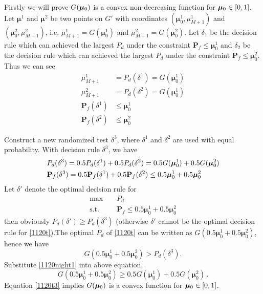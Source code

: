 Firstly we will prove $G(\boldsymbol{\mu}_0)$ is a convex non-decreasing function for $\boldsymbol{\mu}_0 \in [0, 1]$.
 Let $\boldsymbol{\mu}^1$ and  $\boldsymbol{\mu}^2$ be two points on $G'$ with coordinates $(\boldsymbol{\mu}^1_0, \mu_{M+1}^1)$ and $(\boldsymbol{\mu}^2_0, \mu_{M+1}^2)$, i.e. $\mu_{M+1}^1 = G(\boldsymbol{\mu}_0^1)$ and $\mu_{M+1}^2 = G(\boldsymbol{\mu}_0^2)$. Let $\delta_1$ be the decision rule which can achieved the largest $P_d$ under the constraint $\mathbf{P}_f \leq \boldsymbol{\mu}_0^1$ and $\delta_2$ be the decision rule which can achieved the largest $P_d$ under the constraint $\mathbf{P}_{f} \leq \boldsymbol{\mu}_0^2$. Thus we can see 
 \begin{subequations}
\begin{align}
\mu_{M+1}^1 &= P_d(\delta^1) = G(\boldsymbol{\mu}_0^1)\\
\mu_{M+1}^2 &= P_d(\delta^2)=G(\boldsymbol{\mu}_0^1)\\
\mathbf{P}_f(\delta^1) &\leq \boldsymbol{\mu}^1_0\\
\mathbf{P}_f(\delta^2) &\leq \boldsymbol{\mu}^2_0
\end{align}
 \end{subequations}
 
Construct a new randomized test $\delta^3$, where $\delta^1$ and $\delta^2$ are used with equal probability. With decision rule $\delta^3$, we have 
\begin{subequations}
\begin{align}
\label{1120night1}
&P_d(\delta^3) = 0.5P_d(\delta^1)+0.5P_d(\delta^2) = 0.5G(\boldsymbol{\mu}_0^1) + 0.5G(\boldsymbol{\mu}_0^2)\\
&\mathbf{P}_{f}(\delta^3) = 0.5\mathbf{P}_f(\delta^1)+0.5\mathbf{P}_f(\delta^2) \leq 0.5\boldsymbol{\mu}^1_0 + 0.5\boldsymbol{\mu}^2_0
\end{align}
\end{subequations}
Let $\delta'$ denote the optimal decision rule for 
 \begin{equation}
 \begin{split}
 \label{1120t}
 \max&\;\;\;\;P_d\\
 \text{s.t.}&\;\;\;\;\mathbf{P}_f \leq 0.5\boldsymbol{\mu}^1_0 + 0.5\boldsymbol{\mu}^2_0
 \end{split}
 \end{equation}
then obviously $P_d(\delta') \geq P_d(\delta^3)$ (otherwise $\delta'$ cannot be the optimal decision rule for \eqref{1120t}).The optimal $P_d$ of \eqref{1120t} can be written as $G(0.5\boldsymbol{\mu}^1_0 + 0.5\boldsymbol{\mu}^2_0)$, hence we have  
\begin{equation}
\label{1120t2}
G(0.5\boldsymbol{\mu}^1_0 + 0.5\boldsymbol{\mu}^2_0) > P_d(\delta^3).
\end{equation}
Substitute \eqref{1120night1} into above equation,
\begin{equation}
\label{1120t3}
G(0.5\boldsymbol{\mu}^1_0 + 0.5\boldsymbol{\mu}^2_0) \geq 0.5 G(\boldsymbol{\mu}^1_0)+ 0.5 G(\boldsymbol{\mu}^2_0)\,.
\end{equation}
Equation \eqref{1120t3} implies $G(\boldsymbol{\mu}_0)$ is a convex function for $\boldsymbol{\mu}_0 \in [0, 1]$.

